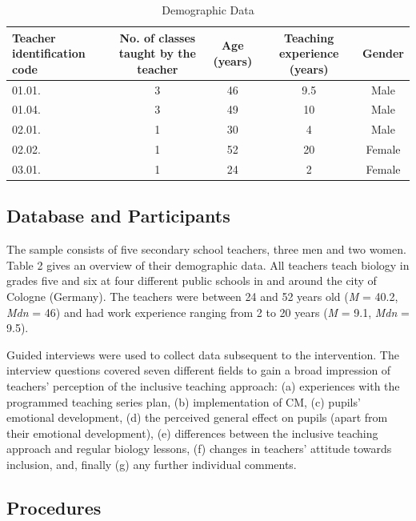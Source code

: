 \documentclass[11.5pt]{sig-alternate} %
\begin{document}
\begin{large}
\begin{table}[t]
\caption{Demographic Data}
\begin{tabular}{lcccc}
\hline
Teacher identification code & No. of classes taught by the teacher & Age (years) & Teaching experience (years) & Gender \\ \hline
01.01. & 3 & 46 & 9.5 & Male \\
01.04. & 3 & 49 & 10 & Male \\
02.01. & 1 & 30 & 4 & Male \\
02.02. & 1 & 52 & 20 & Female \\
03.01. & 1 & 24 & 2 & Female \\ \hline
\end{tabular}
\end{table}

\subsection*{Database and Participants}

The sample consists of five secondary school teachers, three men and two women. Table 2 gives an overview of their demographic data. All teachers teach biology in grades five and six at four different public schools in and around the city of Cologne (Germany). The teachers were between 24 and 52 years old (\textit{M} = 40.2, \textit{Mdn} = 46) and had work experience ranging from 2 to 20 years (\textit{M} = 9.1, \textit{Mdn} = 9.5).

Guided interviews were used to collect data subsequent to the intervention. The interview questions covered seven different fields to gain a broad impression of teachers’ perception of the inclusive teaching approach: (a) experiences with the programmed teaching series plan, (b) implementation of CM, (c) pupils’ emotional development, (d) the perceived general effect on pupils (apart from their emotional development), (e) differences between the inclusive teaching approach and regular biology lessons, (f) changes in teachers’ attitude towards inclusion, and, finally (g) any further individual comments. 

\subsection*{Procedures}


\end{large}
\end{document}
